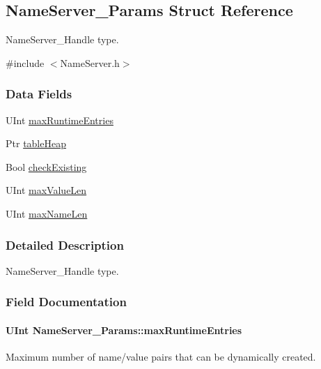 \subsection{NameServer\_\-Params Struct Reference}
\label{struct_name_server___params}


NameServer\_\-Handle type.  




{\ttfamily \#include $<$NameServer.h$>$}

\subsubsection*{Data Fields}
\begin{DoxyCompactItemize}
\item 
UInt \hyperlink{struct_name_server___params_a26ee68e20b559b4c238c1e5a8646191f}{maxRuntimeEntries}
\item 
Ptr \hyperlink{struct_name_server___params_ac9c03b5c29cfe0507d2015c08253f69d}{tableHeap}
\item 
Bool \hyperlink{struct_name_server___params_ac1accae9db70ea330e40c8da8d311eab}{checkExisting}
\item 
UInt \hyperlink{struct_name_server___params_afa31d4aaa38615278dd7d8b25603bf5d}{maxValueLen}
\item 
UInt \hyperlink{struct_name_server___params_a8fcc951ae29abaa33f11360cc4fa6441}{maxNameLen}
\end{DoxyCompactItemize}


\subsubsection{Detailed Description}
NameServer\_\-Handle type. 

\subsubsection{Field Documentation}
\paragraph[{maxRuntimeEntries}]{\setlength{\rightskip}{0pt plus 5cm}UInt {\bf NameServer\_\-Params::maxRuntimeEntries}}\hfill\label{struct_name_server___params_a26ee68e20b559b4c238c1e5a8646191f}
Maximum number of name/value pairs that can be dynamically created.

